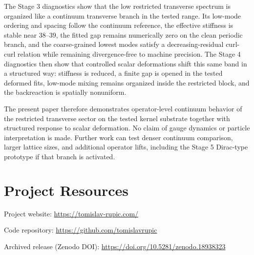 \documentclass[11pt]{article}
\begin{document}
The Stage 3 diagnostics show that the low restricted transverse spectrum is organized like a continuum transverse branch in the tested range. Its low-mode ordering and spacing follow the continuum reference, the effective stiffness is stable near $38$--$39$, the fitted gap remains numerically zero on the clean periodic branch, and the coarse-grained lowest modes satisfy a decreasing-residual curl-curl relation while remaining divergence-free to machine precision. The Stage 4 diagnostics then show that controlled scalar deformations shift this same band in a structured way: stiffness is reduced, a finite gap is opened in the tested deformed fits, low-mode mixing remains organized inside the restricted block, and the backreaction is spatially nonuniform.

The present paper therefore demonstrates operator-level continuum behavior of the restricted transverse sector on the tested kernel substrate together with structured response to scalar deformation. No claim of gauge dynamics or particle interpretation is made. Further work can test denser continuum comparison, larger lattice sizes, and additional operator lifts, including the Stage 5 Dirac-type prototype if that branch is activated.

\section*{Project Resources}
Project website: \url{https://tomislav-rupic.com/}

Code repository: \url{https://github.com/tomislavrupic}

Archived release (Zenodo DOI): \url{https://doi.org/10.5281/zenodo.18938323}
\end{document}
